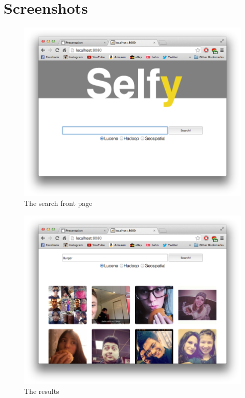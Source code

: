 \documentclass[11pt]{article}
\begin{document}
\section{Screenshots}
	\begin{figure}[H]
		\includegraphics[keepaspectratio,width=\textwidth]{screenshot1.png}
		\caption{The search front page}
	\end{figure}
	\begin{figure}[H]
		\includegraphics[keepaspectratio,width=\textwidth]{screenshot2.png}
		\caption{The results}
	\end{figure}
\end{document}

